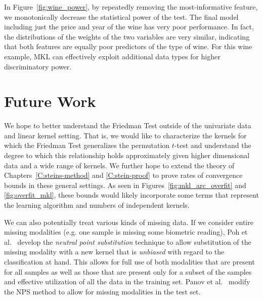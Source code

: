 In Figure~\ref{fig:wine_power}, by repeatedly removing the
most-informative feature, we monotonically decrease the statistical
power of the test.  The final model including just the price and year
of the wine has very poor performance.  In fact, the distributions of
the weights of the two variables are very similar, indicating that
both features are equally poor predictors of the type of wine.  For
this wine example, MKL can effectively exploit additional data types
for higher discriminatory power.

\section{Future Work}
We hope to better understand the Friedman Test outside of the
univariate data and linear kernel setting.  That is, we would like to
characterize the kernels for which the Friedman Test generalizes the
permutation $t$-test and understand the degree to which this
relationship holds approximately given higher dimensional data and a
wide range of kernels.  We further hope to extend the theory of
Chapters~\ref{C:steins-method} and \ref{C:stein-proof} to prove rates
of convergence bounds in these general settings.  As seen in
Figures~\ref{fig:mkl_arc_overfit} and \ref{fig:overfit_mkl}, these bounds
would likely incorporate some terms that represent the learning
algorithm and numbers of independent kernels.

We can also potentially treat various kinds of missing data.
If we consider entire missing modalities (e.g. one sample is
missing some biometric reading), Poh et al.\ \cite{poh2010addressing}
develop the \emph{neutral point substitution} technique to allow
substitution of the missing modality with a new kernel that is
\emph{unbiased} with regard to the classification at hand.  This
allows for full use of both modalities that are present for all
samples as well as those that are present only for a subset of the
samples and effective utilization of all the data in the training set.
Panov et al.\ \cite{panov2011modified} modify the NPS method to allow
for missing modalities in the test set.